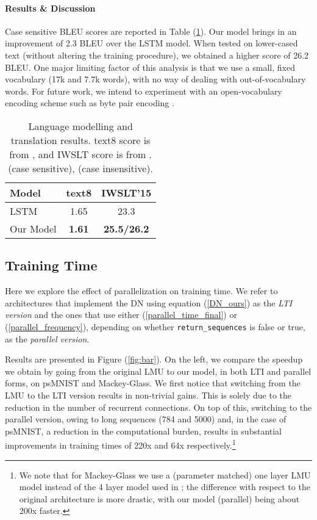 \documentclass{article}
\begin{document}
\paragraph{Results \& Discussion} Case sensitive BLEU scores are reported in Table (\ref{table: text8, iwslt15}). Our model brings in an improvement of 2.3 BLEU over the LSTM model. When tested on lower-cased text (without altering the training procedure), we obtained a higher score of 26.2 BLEU. One major limiting factor of this analysis is that we use a small, fixed vocabulary (17k and 7.7k words), with no way of dealing with out-of-vocabulary words. For future work, we intend to experiment with an open-vocabulary encoding scheme such as byte pair encoding \cite{sennrich2015neural}. 

\begin{table}
\caption{Language modelling and translation results. text8 score is from \citet{zhang2016architectural}, and IWSLT score is from  \citet{luong2015stanford}. (case sensitive), (case insensitive).} 
\label{table: text8, iwslt15}
\begin{center}
\begin{tabular}{lcc}
\hline\noalign{\smallskip}
Model & text8 & IWSLT'15 \\
\hline\noalign{\smallskip}
LSTM        &  1.65        &  23.3         \\
Our Model   & {\bf 1.61}    & {\bf 25.5/26.2}    \\
\hline
\end{tabular}
\end{center}
\end{table}



\subsection{Training Time}\label{section: Training time}
Here we explore the effect of parallelization on training time. We refer to architectures that implement the DN using equation (\ref{DN_ours}) as the \textit{LTI version} and the ones that use either (\ref{parallel_time_final}) or (\ref{parallel_frequency}), depending on whether \verb|return_sequences| is false or true, as the \textit{parallel version}. 



Results are presented in Figure (\ref{fig:bar}). On the left, we compare the speedup we obtain by going from the original LMU to our model, in both LTI and parallel forms, on psMNIST and Mackey-Glass. We first notice that switching from the LMU to the LTI version results in non-trivial gains. This is solely due to the reduction in the number of recurrent connections. On top of this, switching to the parallel version, owing to long sequences (784 and 5000) and, in the case of psMNIST, a reduction in the computational burden, results in substantial improvements in training times of 220x and 64x respectively.\footnote{We note that for Mackey-Glass we use a (parameter matched) one layer LMU model instead of the 4 layer model used in \citet{voelker2019legendre}; the difference with respect to the original architecture is more drastic, with our model (parallel) being about 200x faster.}
\end{document}

